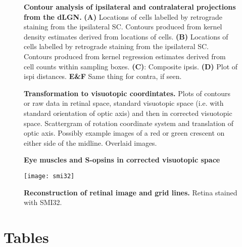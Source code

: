 \documentclass[10pt]{article}
\begin{document}
\begin{figure}[!ht]
  \centering
  \caption{\textbf{Contour analysis of ipsilateral and contralateral
      projections from the dLGN.}
    \textbf{(A)} Locations of cells labelled by retrograde staining
    from the ipsilateral SC.  Contours produced from kernel density
    estimates derived from locations of cells. \textbf{(B)} Locations
    of cells labelled by retrograde staining from the ipsilateral SC.
    Contours produced from kernel regression estimates derived from
    cell counts within sampling boxes. \textbf{(C)}: Composite
    ipsis. \textbf{(D)} Plot of ispi distances. \textbf{E\&F} Same
    thing for contra, if seen.}
  \label{retistruct_plos:fig:contouring}
\end{figure}

\begin{figure}[!ht]
  \centering

  \caption{\textbf{Transformation to visuotopic coordintates.} Plots
    of contours or raw data in retinal space, standard visuotopic
    space (i.e. with standard orientation of optic axis) and then in
    corrected visuotopic space. Scattergram of rotation coordinate
    system and translation of optic axis. Possibly example images of a
    red or green crescent on either side of the midline. Overlaid
    images.}
  \label{retistruct_plos:fig:visuotopic}
\end{figure}

\begin{figure}[!ht]
  \centering
  
  \caption{\textbf{Eye muscles and S-opsins in corrected
      visuotopic space}}
  \label{retistruct_plos:fig:s-opsins}
\end{figure}

\begin{figure}[!ht]
  \centering
  \texttt{[image: smi32]}
  \caption{\textbf{Reconstruction of retinal image and grid lines.}
    Retina stained with SMI32. }
  \label{retistruct_plos:fig:superpose}
\end{figure}



\section*{Tables}
\end{document}

